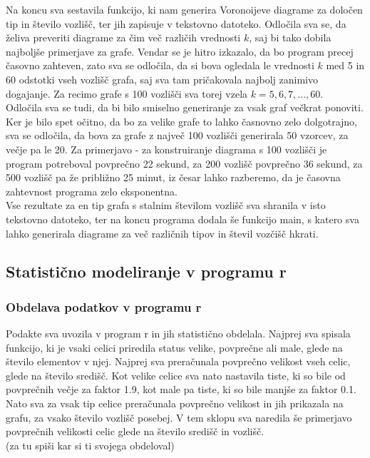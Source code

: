 \documentclass[
]{article}
\begin{document}
Na koncu sva sestavila funkcijo, ki nam generira Voronoijeve diagrame za
določen tip in število vozlišč, ter jih zapisuje v tekstovno datoteko.
Odločila sva se, da želiva preveriti diagrame za čim več različih
vrednosti \(k\), saj bi tako dobila najboljše primerjave za grafe.
Vendar se je hitro izkazalo, da bo program precej časovno zahteven, zato
sva se odločila, da si bova ogledala le vrednosti \(k\) med 5 in 60
odstotki vseh vozlišč grafa, saj sva tam pričakovala najbolj zanimivo
dogajanje. Za recimo grafe s 100 vozlišči sva torej vzela
\(k=5, 6, 7, ..., 60\).\\
Odločila sva se tudi, da bi bilo smiselno generiranje za vsak graf
večkrat ponoviti. Ker je bilo spet očitno, da bo za velike grafe to
lahko časnovno zelo dolgotrajno, sva se odločila, da bova za grafe z
največ 100 vozlišči generirala 50 vzorcev, za večje pa le 20. Za
primerjavo - za konstruiranje diagrama s 100 vozlišči je program
potreboval povprečno 22 sekund, za 200 vozlišč povprečno 36 sekund, za
500 vozlišč pa že približno 25 minut, iz česar lahko razberemo, da je
časovna zahtevnost programa zelo eksponentna.\\
Vse rezultate za en tip grafa s stalnim številom vozlišč sva shranila v
isto tekstovno datoteko, ter na koncu programa dodala še funkcijo main,
s katero sva lahko generirala diagrame za več različnih tipov in števil
vozčišč hkrati.

\hypertarget{statistiux10dno-modeliranje-v-programu-r}{%
\subsection{Statistično modeliranje v programu
r}\label{statistiux10dno-modeliranje-v-programu-r}}

\hypertarget{obdelava-podatkov-v-programu-r}{%
\subsubsection{Obdelava podatkov v programu
r}\label{obdelava-podatkov-v-programu-r}}

Podakte sva uvozila v program r in jih statistično obdelala. Najprej sva
spisala funkcijo, ki je vsaki celici priredila status velike, povprečne
ali male, glede na število elementov v njej. Najprej sva preračunala
povprečno velikost vseh celic, glede na število središč. Kot velike
celice sva nato nastavila tiste, ki so bile od povprečnih večje za
faktor 1.9, kot male pa tiste, ki so bile manjše za faktor 0.1. Nato sva
za vsak tip celice preračunala povprečno velikost in jih prikazala na
grafu, za vsako število vozlišč posebej. V tem sklopu sva naredila še
primerjavo povprečnih velikosti celic glede na število središč in
vozlišč.\\
(za tu spiši kar si ti svojega obdeloval)
\end{document}

